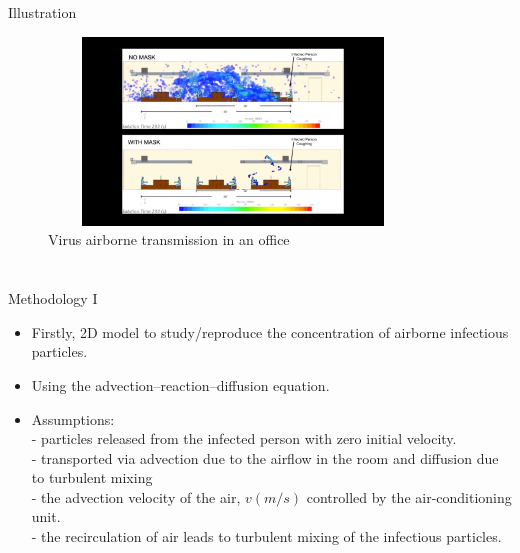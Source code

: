 \documentclass[10pt]{beamer}
\newcommand{\PIV}{}
\newcommand{\PV}{}
\begin{document}
\section{\PIV} 
\begin{frame}{Illustration}{\PIV} 
        \begin{figure}
         \includegraphics[width=9.8cm, height=5cm]{illu.png}
            \caption{Virus airborne transmission in an office }
           \end{figure}  
\end{frame}



\section{\PV} 
\begin{frame}{Methodology I}{\PV} 
    \begin{itemize}
        \item Firstly, 2D model to study/reproduce the concentration of airborne infectious particles.
        \item Using the advection–reaction–diffusion equation.
        \item Assumptions: \\- particles  released from
        the infected person with zero initial velocity.
        \\ - transported via advection due to the airflow in the room and diffusion due to turbulent mixing
        \\ - the advection velocity of the air, $v (m/s)$ controlled by the air-conditioning unit.
        \\ -  the recirculation of air leads to turbulent mixing of the infectious particles.  
    \end{itemize}  

\end{frame}
\end{document}
